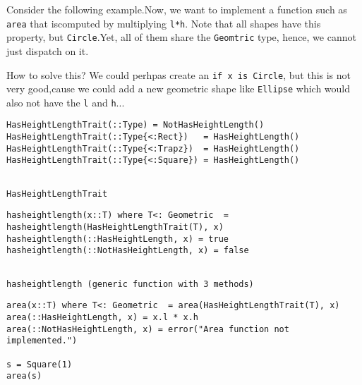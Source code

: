 Consider the following example.Now, we want to implement a function such as \lstinline[style=julia]{area} that iscomputed by multiplying \lstinline[style=julia]{l*h}. Note that all shapes have this property, but \lstinline[style=julia]{Circle}.Yet, all of them share the \lstinline[style=julia]{Geomtric} type, hence, we cannot just dispatch on it.

How to solve this? We could perhpas create an \lstinline[style=julia]{if x is Circle}, but this is not very good,cause we could add a new geometric shape like \lstinline[style=julia]{Ellipse} which would also not have the \lstinline[style=julia]{l} and \lstinline[style=julia]{h}...
\bigskip
\begin{lstlisting}[language=JuliaLocal, style=julia, texcl=true]
HasHeightLengthTrait(::Type) = NotHasHeightLength()
HasHeightLengthTrait(::Type{<:Rect})   = HasHeightLength()
HasHeightLengthTrait(::Type{<:Trapz})  = HasHeightLength()
HasHeightLengthTrait(::Type{<:Square}) = HasHeightLength()
\end{lstlisting}

\begingroup

\fontsize{10pt}{12pt}\selectfont

\begin{verbatim}

HasHeightLengthTrait
\end{verbatim}

\endgroup

\bigskip
\begin{lstlisting}[language=JuliaLocal, style=julia, texcl=true]
hasheightlength(x::T) where T<: Geometric  = hasheightlength(HasHeightLengthTrait(T), x)
hasheightlength(::HasHeightLength, x) = true
hasheightlength(::NotHasHeightLength, x) = false
\end{lstlisting}

\begingroup

\fontsize{10pt}{12pt}\selectfont

\begin{verbatim}

hasheightlength (generic function with 3 methods)
\end{verbatim}

\endgroup

\bigskip
\begin{lstlisting}[language=JuliaLocal, style=julia, texcl=true]
area(x::T) where T<: Geometric  = area(HasHeightLengthTrait(T), x)
area(::HasHeightLength, x) = x.l * x.h
area(::NotHasHeightLength, x) = error("Area function not implemented.")

s = Square(1)
area(s)
\end{lstlisting}

